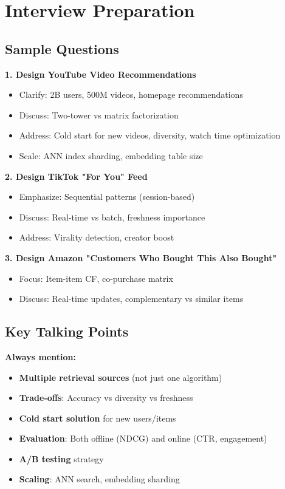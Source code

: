 \documentclass[10pt]{article}
\begin{document}
\section{Interview Preparation}

\subsection{Sample Questions}

\textbf{1. Design YouTube Video Recommendations}
\begin{itemize}
\item Clarify: 2B users, 500M videos, homepage recommendations
\item Discuss: Two-tower vs matrix factorization
\item Address: Cold start for new videos, diversity, watch time optimization
\item Scale: ANN index sharding, embedding table size
\end{itemize}

\textbf{2. Design TikTok "For You" Feed}
\begin{itemize}
\item Emphasize: Sequential patterns (session-based)
\item Discuss: Real-time vs batch, freshness importance
\item Address: Virality detection, creator boost
\end{itemize}

\textbf{3. Design Amazon "Customers Who Bought This Also Bought"}
\begin{itemize}
\item Focus: Item-item CF, co-purchase matrix
\item Discuss: Real-time updates, complementary vs similar items
\end{itemize}

\subsection{Key Talking Points}

\textbf{Always mention:}
\begin{itemize}
\item \textbf{Multiple retrieval sources} (not just one algorithm)
\item \textbf{Trade-offs}: Accuracy vs diversity vs freshness
\item \textbf{Cold start solution} for new users/items
\item \textbf{Evaluation}: Both offline (NDCG) and online (CTR, engagement)
\item \textbf{A/B testing} strategy
\item \textbf{Scaling}: ANN search, embedding sharding
\end{itemize}
\end{document}
